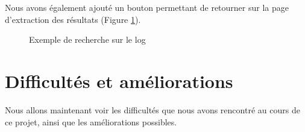 Nous avons également ajouté un bouton permettant de retourner sur la page d'extraction des résultats (Figure \ref{affichageExtraction}).

\begin{figure}[!ht]
	\begin{center}
		\caption{Exemple de recherche sur le log}
  		\label{affichageExtraction}
  	\end{center}	
\end{figure}

\chapter{Difficultés et améliorations}

Nous allons maintenant voir les difficultés que nous avons rencontré au cours de ce projet, ainsi que les améliorations possibles. \\

